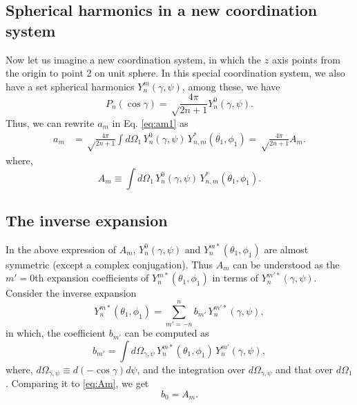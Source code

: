 \documentclass[11pt]{article}
\begin{document}
\subsection{Spherical harmonics in a new coordination system}



Now let us imagine a new coordination system,
in which the $z$ axis points from the origin to point 2 on unit sphere.
%
In this special coordination system,
we also have a set spherical harmonics $Y_n^m(\gamma, \psi)$,
among these, we have
\[
  P_n(\cos\gamma)
=
\sqrt \frac { 4 \pi } { 2 n + 1 }
  Y_n^0(\gamma, \psi).
\]
Thus, we can rewrite $a_m$ in Eq. \eqref{eq:am1} as
\begin{align}
a_m
&=
\sqrt \frac{4 \pi}{ 2 n + 1 }
\int d\Omega_1 \, Y_n^0(\gamma, \psi) \, Y^*_{n,m}(\theta_1, \phi_1)
=
\sqrt \frac{4 \pi}{ 2 n + 1 } A_m.
\label{eq:am2}
\end{align}
%
where,
\begin{equation}
A_m
\equiv
\int d\Omega_1 \, Y_n^0(\gamma, \psi) \, Y^*_{n,m}(\theta_1, \phi_1).
\label{eq:Am}
\end{equation}



\subsection{The inverse expansion}



In the above expression of $A_m$,
$Y_n^0(\gamma, \psi)$ and $Y_n^{m*}(\theta_1, \phi_1)$
are almost symmetric (except a complex conjugation).
%
Thus $A_m$
can be understood as the $m'=0$th expansion coefficients
of $Y_n^{m*}(\theta_1, \phi_1)$
in terms of $Y_n^{m'*}(\gamma, \psi)$.
%
Consider the inverse expansion
\begin{equation}
  Y_n^{m*}(\theta_1, \phi_1)
=
  \sum_{m' = -n}^n b_{m'} \,Y_n^{m'*}(\gamma, \psi),
  \label{eq:expansion2}
\end{equation}
in which,
the coefficient $b_{m'}$ can be computed as
\begin{equation}
  b_{m'}
=
  \int d \Omega_{\gamma,\psi} \,
  Y_n^{m*}(\theta_1, \phi_1) \,
  Y_n^{m'}(\gamma, \psi),
  \label{eq:bm}
\end{equation}
where, $d\Omega_{\gamma, \psi} \equiv d(-\cos\gamma) d\psi$,
and the integration over $d\Omega_{\gamma, \psi}$
and that over $d\Omega_1$.
Comparing it to \eqref{eq:Am}, we get
\begin{equation}
  b_0 = A_m.
  \label{eq:b0Am}
\end{equation}
\end{document}

